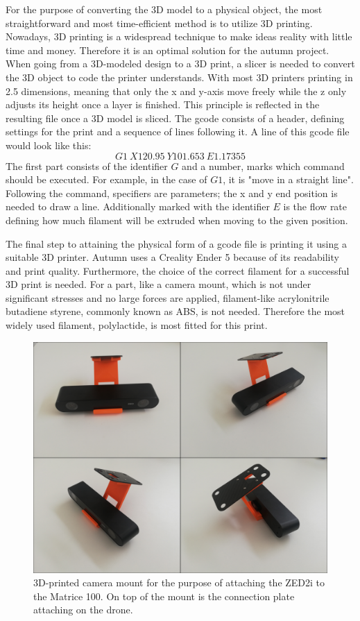 For the purpose of converting the 3D model to a physical object, the most straightforward and most time-efficient method is to utilize 3D printing. Nowadays, 3D printing is a widespread technique to make ideas reality with little time and money. Therefore it is an optimal solution for the autumn project. 
When going from a 3D-modeled design to a 3D print, a slicer is needed to convert the 3D object to code the printer understands. With most 3D printers printing in 2.5 dimensions, meaning that only the x and y-axis move freely while the z only adjusts its height once a layer is finished. This principle is reflected in the resulting file once a 3D model is sliced. The gcode consists of a header, defining settings for the print and a sequence of lines following it. A line of this gcode file would look like this: 
\[G1\ X120.95\ Y101.653\ E1.17355\]
The first part consists of the identifier $G$ and a number, marks which command should be executed. For example, in the case of $G1$, it is "move in a straight line". Following the command, specifiers are parameters; the x and y end position is needed to draw a line. Additionally marked with the identifier $E$ is the flow rate defining how much filament will be extruded when moving to the given position.

The final step to attaining the physical form of a gcode file is printing it using a suitable 3D printer. Autumn uses a Creality Ender 5 because of its readability and print quality. Furthermore, the choice of the correct filament for a successful 3D print is needed. For a part, like a camera mount, which is not under significant stresses and no large forces are applied, filament-like acrylonitrile butadiene styrene, commonly known as ABS, is not needed. Therefore the most widely used filament, polylactide, is most fitted for this print.

\begin{figure}[h]
	\centering
	\includegraphics[width=0.6\linewidth]{img/MountPrint}
	\caption{3D-printed camera mount for the purpose of attaching the ZED2i to the Matrice 100. On top of the mount is the connection plate attaching on the drone.}
	\label{fig:custom_parts_mountPrint}
\end{figure}

